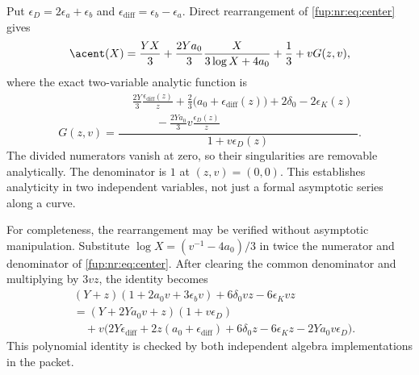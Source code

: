 \documentclass[11pt,letterpaper]{article}
\theoremstyle{definition}\newtheorem{definition}[theorem]{Definition}
\theoremstyle{remark}\newtheorem{remark}[theorem]{Remark}
\begin{document}
Put $\epsilon_D=2\epsilon_a+\epsilon_b$ and $\epsilon_{\mathrm{diff}}=\epsilon_b-\epsilon_a$. Direct rearrangement of \eqref{fup:nr:eq:center} gives
\begin{equation}\label{fup:nr:eq:split}
 \acent(X)=\frac{YX}3+\frac{2Ya_0}3\frac{X}{3\log X+4a_0}
             +\frac13+vG(z,v),
\end{equation}
where the exact two-variable analytic function is
\begin{equation}\label{fup:nr:eq:G}
 G(z,v)=\frac{
 \begin{aligned}
 &\frac{2Y}3\frac{\epsilon_{\mathrm{diff}}(z)}z
 +\frac23\bigl(a_0+\epsilon_{\mathrm{diff}}(z)\bigr)
 +2\delta_0-2\epsilon_K(z)\\[-1pt]
 &\hspace{25pt}-\frac{2Ya_0}3v\frac{\epsilon_D(z)}z
 \end{aligned}}{1+v\epsilon_D(z)}.
\end{equation}
The divided numerators vanish at zero, so their singularities are removable analytically. The denominator is $1$ at $(z,v)=(0,0)$. This establishes analyticity in two independent variables, not just a formal asymptotic series along a curve.

For completeness, the rearrangement may be verified without asymptotic manipulation. Substitute $\log X=(v^{-1}-4a_0)/3$ in twice the numerator and denominator of \eqref{fup:nr:eq:center}. After clearing the common denominator and multiplying by $3vz$, the identity becomes
\begin{align*}
 &(Y+z)(1+2a_0v+3\epsilon_bv)+6\delta_0vz-6\epsilon_Kvz\\
 &=(Y+2Ya_0v+z)(1+v\epsilon_D)\\
 &\quad+v\bigl(2Y\epsilon_{\mathrm{diff}}+2z(a_0+\epsilon_{\mathrm{diff}})
       +6\delta_0z-6\epsilon_Kz-2Ya_0v\epsilon_D\bigr).
\end{align*}
This polynomial identity is checked by both independent algebra implementations in the packet.
\end{document}
